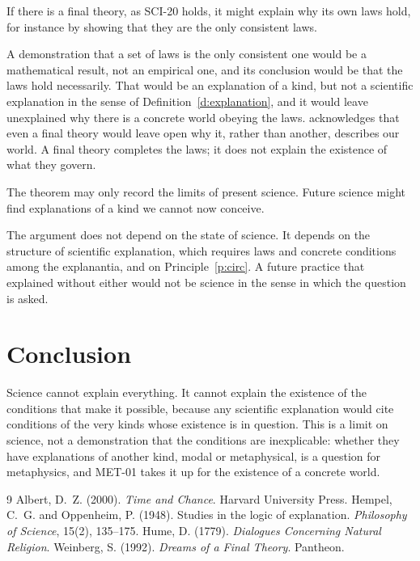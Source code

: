\documentclass{situationist-preprint}
\begin{document}
\begin{objection}
If there is a final theory, as SCI-20 holds, it might explain why its own laws hold, for instance by showing that they are the only consistent laws.
\end{objection}

\begin{reply}
A demonstration that a set of laws is the only consistent one would be a mathematical result, not an empirical one, and its conclusion would be that the laws hold necessarily. That would be an explanation of a kind, but not a scientific explanation in the sense of Definition~\ref{d:explanation}, and it would leave unexplained why there is a concrete world obeying the laws. \citet{Weinberg1992} acknowledges that even a final theory would leave open why it, rather than another, describes our world. A final theory completes the laws; it does not explain the existence of what they govern.
\end{reply}

\begin{objection}[Ignorance]
The theorem may only record the limits of present science. Future science might find explanations of a kind we cannot now conceive.
\end{objection}

\begin{reply}
The argument does not depend on the state of science. It depends on the structure of scientific explanation, which requires laws and concrete conditions among the explanantia, and on Principle~\ref{p:circ}. A future practice that explained without either would not be science in the sense in which the question is asked.
\end{reply}

\section{Conclusion}

Science cannot explain everything. It cannot explain the existence of the conditions that make it possible, because any scientific explanation would cite conditions of the very kinds whose existence is in question. This is a limit on science, not a demonstration that the conditions are inexplicable: whether they have explanations of another kind, modal or metaphysical, is a question for metaphysics, and MET-01 takes it up for the existence of a concrete world.

\begin{thebibliography}{9}\small
{} Albert, D.~Z. (2000). \emph{Time and Chance}. Harvard University Press.
 Hempel, C.~G. and Oppenheim, P. (1948). Studies in the logic of explanation. \emph{Philosophy of Science}, 15(2), 135--175.
 Hume, D. (1779). \emph{Dialogues Concerning Natural Religion}.
 Weinberg, S. (1992). \emph{Dreams of a Final Theory}. Pantheon.
\end{thebibliography}
\end{document}
